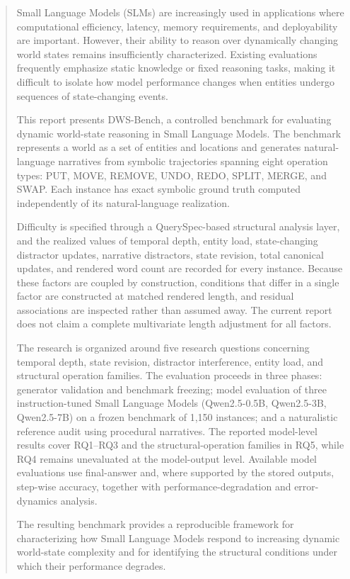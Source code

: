 \documentclass{iutbscthesis}
\begin{document}
\begin{abstract}
Small Language Models (SLMs) are increasingly used in applications where computational efficiency,
latency, memory requirements, and deployability are important. However, their ability to reason over
dynamically changing world states remains insufficiently characterized. Existing evaluations frequently
emphasize static knowledge or fixed reasoning tasks, making it difficult to isolate how model performance
changes when entities undergo sequences of state-changing events.

This report presents DWS-Bench, a controlled benchmark for evaluating dynamic world-state reasoning
in Small Language Models. The benchmark represents a world as a set of entities and locations and
generates natural-language narratives from symbolic trajectories spanning eight operation types:
PUT, MOVE, REMOVE, UNDO, REDO, SPLIT, MERGE, and SWAP. Each instance has exact symbolic ground
truth computed independently of its natural-language realization.

Difficulty is specified through a QuerySpec-based structural analysis layer, and the realized values of
temporal depth, entity load, state-changing distractor updates, narrative distractors, state revision,
total canonical updates, and rendered word count are recorded for every instance. Because these factors
are coupled by construction, conditions that differ in a single factor are constructed at matched
rendered length, and residual associations are inspected rather than assumed away. The current report
does not claim a complete multivariate length adjustment for all factors.

The research is organized around five research questions concerning temporal depth, state revision,
distractor interference, entity load, and structural operation families. The evaluation proceeds in
three phases: generator validation and benchmark freezing; model evaluation of three instruction-tuned
Small Language Models (Qwen2.5-0.5B, Qwen2.5-3B, Qwen2.5-7B) on a frozen benchmark of 1,150 instances;
and a naturalistic reference audit using procedural narratives. The reported model-level results cover
RQ1--RQ3 and the structural-operation families in RQ5, while RQ4 remains unevaluated at the model-output
level. Available model evaluations use final-answer and, where supported by the stored outputs,
step-wise accuracy, together with performance-degradation and error-dynamics analysis.

The resulting benchmark provides a reproducible framework for characterizing how Small Language Models
respond to increasing dynamic world-state complexity and for identifying the structural conditions under
which their performance degrades.
\end{abstract}
\end{document}
